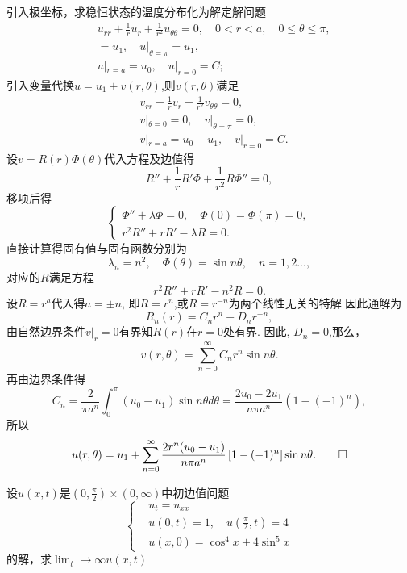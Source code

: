 \begin{solve}
	引入极坐标，求稳恒状态的温度分布化为解定解问题
	$$\begin{aligned}
		&u_{rr}+\frac{1}{r}u_{r}+\frac{1}{r^{2}}u_{\theta\theta}=0,\quad0<r<a,\quad0\leq\theta\leq\pi,\\
		&=u_{1},\quad u|_{\theta=\pi}=u_{1},\\
		&u|_{r=a}=u_{0},\quad u|_{r=0}=C;
	\end{aligned}$$
	引入变量代换$u=u_1+v(r,\theta)$,则$v(r,\theta)$满足
	$$\begin{aligned}
		&v_{rr}+\frac{1}{r}v_{r}+\frac{1}{r^{2}}v_{\theta\theta}=0,\\
		&v|_{\theta=0}=0,\quad v|_{\theta=\pi}=0,\\
		&v|_{r=a}=u_{0}-u_{1},\quad v|_{r=0}=C.
	\end{aligned}$$
	设$v=R(r)\Phi(\theta)$代入方程及边值得
	$$R''+\frac{1}{r}R'\Phi+\frac{1}{r^{2}}R\Phi''=0,$$
	移项后得
	$$\left\{\begin{array}{l}
		\varPhi''+\lambda\varPhi=0,\quad\varPhi(0)=\varPhi(\pi)=0,\\
		r^2R''+rR'-\lambda R=0.
	\end{array}\right.$$
	直接计算得固有值与固有函数分别为
	$$\lambda_n=n^2,\quad\varPhi(\theta)=\sin n\theta,\quad n=1,2...,$$
	对应的$R$满足方程
	$$r^2R''+rR'-n^2R=0.$$
	设$R=r^a$代入得$a= \pm n$, 即$R= r^n$,或$R=r^{-n}$为两个线性无关的特解
	因此通解为
	$$R_n(r)=C_nr^n+D_nr^{-n},$$
	由自然边界条件$v|_r=0$有界知$R(r)$在$r=0$处有界. 因此, $D_n=0$,那么，
	$$v(r,\theta)=\sum_{n=0}^\infty C_nr^n\sin n\theta.$$
	再由边界条件得
	$$C_n=\frac{2}{\pi a^n}\int_0^\pi(u_0-u_1)\sin n\theta d\theta=\frac{2u_0-2u_1}{n\pi a^n}\left(1-(-1)^n\right),$$
	所以
	\[u(r,\theta)=u_1+\sum_{n=0}^\infty\frac{2r^n(u_0-u_1)}{n\pi a^n}\left[1-(-1)^n\right]\sin n\theta.\qedhere\]
\end{solve}

\begin{exercise}
	设$u(x,t)$是$(0,\frac\pi2)\times(0,\infty)$中初边值问题
	$$\begin{cases}&u_t=u_{xx}\\&u(0,t)=1,\quad u(\frac{\pi}{2},t)=4\\&u(x,0)=\cos^4x+4\sin^5x\end{cases}$$
	的解，求$\lim_t\to\infty u(x,t)$
\end{exercise}

